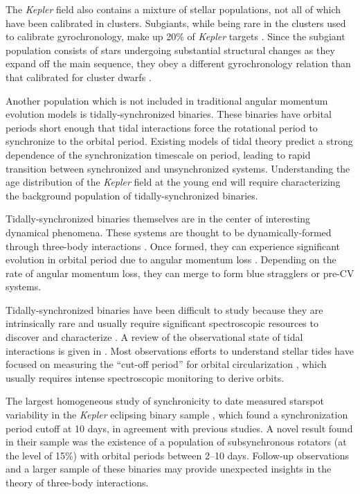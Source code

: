 \documentclass[twocolumn]{aastex6}
\newcommand{\Kepler}{\mbox{\textit{Kepler}}}
\begin{document}
The \Kepler{} field also contains a mixture of stellar populations, not all of 
which have been calibrated in clusters. Subgiants, while being rare in the 
clusters used to calibrate gyrochronology, 
make up 20\% of \Kepler{} targets \citep{Berger18b}. Since the 
subgiant population consists of stars undergoing substantial structural changes
as they expand off the main sequence, they obey a different gyrochronology 
relation than that calibrated for cluster dwarfs \citep{vanSaders13}. 

Another population which is not included in traditional angular momentum
evolution models is tidally-synchronized binaries. These binaries have orbital 
periods short enough that tidal interactions force the rotational period to
synchronize to the orbital period. Existing models of tidal theory 
\citep{Zahn77} predict a strong dependence of the synchronization timescale 
on period, leading to rapid transition between
synchronized and unsynchronized systems. Understanding the 
age distribution of the \Kepler{} field at the young end will require 
characterizing the background population of tidally-synchronized binaries.

Tidally-synchronized binaries themselves are in the center of interesting
dynamical phenomena. These systems are thought to be dynamically-formed 
through three-body interactions \citep{Tokovinin06, Fabrycky07}. Once formed, they can experience significant
evolution in orbital period due to angular momentum loss \citep{Andronov06}.
Depending on the rate of angular momentum loss, they can merge to form blue 
stragglers or pre-CV systems.

Tidally-synchronized binaries have been difficult to study because they are 
intrinsically rare and usually require significant spectroscopic resources 
to discover and characterize \citep{Mathieu90, Raghavan10, Geller15}. A review 
of the observational state of tidal interactions is given in \citet{Mazeh08}. 
Most observations efforts to understand stellar tides have focused on 
measuring the ``cut-off period'' for orbital circularization \citep{Mayor84},
which usually requires intense spectroscopic monitoring to derive orbits.

The largest homogeneous study of synchronicity to date measured starspot 
variability in the \Kepler{} eclipsing binary sample \citep{Lurie17}, which 
found a synchronization period cutoff at 10 days, in agreement with previous studies. 
A novel result found in their sample was the existence of a population of
subsynchronous rotators (at the level of 15\%) with orbital periods between 
2--10 days. Follow-up observations and a larger sample of these binaries may 
provide unexpected insights in the theory of three-body interactions.
\end{document}
